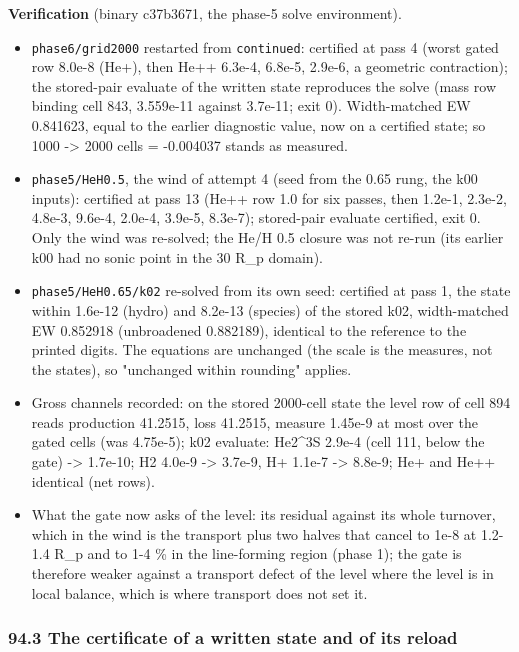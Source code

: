 \documentclass[english,a4paper]{my_memo}
\providecommand{\tightlist}{\setlength{\itemsep}{0pt}\setlength{\parskip}{0pt}}
\begin{document}
\textbf{Verification} (binary c37b3671, the phase-5 solve environment).

\begin{itemize}
\tightlist
\item
  \texttt{phase6/grid2000} restarted from \texttt{continued}: certified at pass 4 (worst
  gated row 8.0e-8 (He+), then He++ 6.3e-4, 6.8e-5, 2.9e-6, a geometric
  contraction); the
  stored-pair evaluate of the written state reproduces the solve (mass row
  binding cell 843, 3.559e-11 against 3.7e-11; exit 0). Width-matched EW
  0.841623, equal to the earlier diagnostic value, now on a certified state;
  so 1000 -\textgreater{} 2000 cells = -0.004037 stands as measured.
\item
  \texttt{phase5/HeH0.5}, the wind of attempt 4 (seed from the 0.65 rung, the k00
  inputs): certified at pass 13 (He++ row 1.0 for six passes, then 1.2e-1,
  2.3e-2, 4.8e-3, 9.6e-4, 2.0e-4, 3.9e-5, 8.3e-7); stored-pair evaluate
  certified, exit 0. Only the wind was re-solved; the He/H 0.5 closure was
  not re-run (its earlier k00 had no sonic point in the 30 R\_p domain).
\item
  \texttt{phase5/HeH0.65/k02} re-solved from its own seed: certified at pass 1, the
  state within 1.6e-12 (hydro) and 8.2e-13 (species) of the stored k02,
  width-matched EW 0.852918 (unbroadened 0.882189), identical to the
  reference to the printed digits. The equations are unchanged (the scale is
  the measure\textquotesingle s, not the state\textquotesingle s), so "unchanged within rounding" applies.
\item
  Gross channels recorded: on the stored 2000-cell state the level row of
  cell 894 reads production 41.2515, loss 41.2515, measure 1.45e-9 at most
  over the gated cells (was 4.75e-5); k02 evaluate: He2\^{}3S 2.9e-4 (cell 111,
  below the gate) -\textgreater{} 1.7e-10; H2 4.0e-9 -\textgreater{} 3.7e-9, H+ 1.1e-7 -\textgreater{} 8.8e-9; He+
  and He++ identical (net rows).
\item
  What the gate now asks of the level: its residual against its whole
  turnover, which in the wind is the transport plus two halves that cancel to
  1e-8 at 1.2-1.4 R\_p and to 1-4 \% in the line-forming region (phase 1); the
  gate is therefore weaker against a transport defect of the level where the
  level is in local balance, which is where transport does not set it.
\end{itemize}

\subsubsection{94.3 The certificate of a written state and of its reload}\label{943-the-certificate-of-a-written-state-and-of-its-reload}
\end{document}

